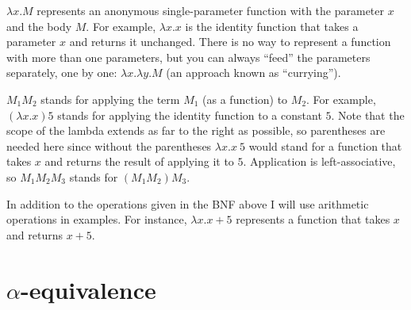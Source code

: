 \documentclass{article}
\newcommand{\lam}{\lambda}
\begin{document}
$\lam x. M$ represents an anonymous single-parameter function with the parameter $x$ and the body $M$. For example, $\lam x. x$ is the identity function that takes a parameter $x$ and returns it unchanged. There is no way to represent a function with more than one parameters, but you can always ``feed'' the parameters separately, one by one: $\lam x. \lam y. M$ (an approach known as ``currying'').

$M_1 M_2$ stands for applying the term $M_1$ (as  a function) to $M_2$. For example, $(\lam x. x) 5$ stands for applying the identity function to a constant $5$. Note that the scope of the lambda extends as far to the right as possible, so parentheses are needed here since without the parentheses   $\lam x. x~5$ would stand for a function that takes $x$ and returns the result of applying it to $5$. Application is left-associative, so $M_1 M_2M_3$ stands for $(M_1 M_2)M_3$. 

In addition to the operations given in the BNF above I will use arithmetic operations in examples. For instance, $\lam x. x + 5$ represents a function that takes $x$ and returns $x + 5$. 

\section{$\alpha$-equivalence}
\end{document}
